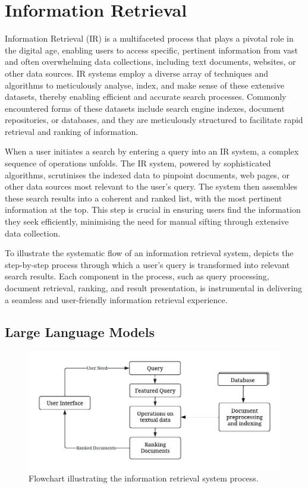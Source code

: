 \section{Information Retrieval}
Information Retrieval (IR) is a multifaceted process that plays a pivotal role in the digital age, enabling users to access specific, pertinent information from vast and often overwhelming data collections, including text documents, websites, or other data sources. IR systems employ a diverse array of techniques and algorithms to meticulously analyse, index, and make sense of these extensive datasets, thereby enabling efficient and accurate search processes. Commonly encountered forms of these datasets include search engine indexes, document repositories, or databases, and they are meticulously structured to facilitate rapid retrieval and ranking of information.

When a user initiates a search by entering a query into an IR system, a complex sequence of operations unfolds. The IR system, powered by sophisticated algorithms, scrutinises the indexed data to pinpoint documents, web pages, or other data sources most relevant to the user's query. The system then assembles these search results into a coherent and ranked list, with the most pertinent information at the top. This step is crucial in ensuring users find the information they seek efficiently, minimising the need for manual sifting through extensive data collection.

To illustrate the systematic flow of an information retrieval system,  depicts the step-by-step process through which a user's query is transformed into relevant search results. Each component in the process, such as query processing, document retrieval, ranking, and result presentation, is instrumental in delivering a seamless and user-friendly information retrieval experience.

\subsection{Large Language Models}
\begin{figure}
    \centering
    \includegraphics[width=\textwidth]{2Background/Background/IR.jpeg}
    \caption{Flowchart illustrating the information retrieval system process.}
    \label{fig:pipelines}
\end{figure}

